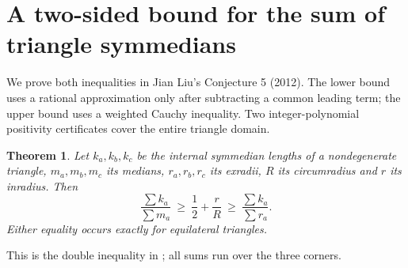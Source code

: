 \documentclass[11pt,a4paper]{article}
\numberwithin{equation}{section}
\newtheorem{theorem}{Theorem}[section]
\theoremstyle{definition}
\theoremstyle{remark}
\newenvironment{sectionabstract}{\par\smallskip\begingroup\small\noindent}{\par\endgroup\medskip}
\begin{document}
\par\endgroup

\begingroup

\section{\texorpdfstring{A two-sided bound for the sum of triangle symmedians}{A two-sided bound for the sum of triangle symmedians}}\label{section:r38reiwa}
\par\medskip


\begin{sectionabstract}
We prove both inequalities in Jian Liu's Conjecture 5 (2012). The lower bound uses a rational approximation only after subtracting a common leading term; the upper bound uses a weighted Cauchy inequality. Two integer-polynomial positivity certificates cover the entire triangle domain.
\end{sectionabstract}
\begin{theorem}
Let $k_a,k_b,k_c$ be the internal symmedian lengths of a nondegenerate triangle, $m_a,m_b,m_c$ its medians, $r_a,r_b,r_c$ its exradii, $R$ its circumradius and $r$ its inradius. Then
\[
 \frac{\sum k_a}{\sum m_a}\ \ge\ \frac12+\frac rR
 \ \ge\ \frac{\sum k_a}{\sum r_a}.
\]
Either equality occurs exactly for equilateral triangles.
\end{theorem}
This is the double inequality in \cite[Conj.~5, Eq.~(4.8)]{r38reiwa:Liu}; all sums run over the three corners.
\end{document}
